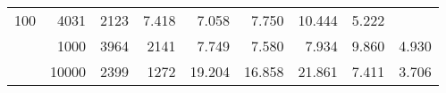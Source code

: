 \begin{table}
\begin{tabular}{rrrrrrrrr}
					\multirow{ 1 }{*}{ 100 } &
					
						
							    
							     4031  & 2123  
	                           & 7.418 & 7.058 & 7.750
	                           & 10.444 & 5.222  \\
	                
	            
					 &  
					 
					\multirow{ 1 }{*}{ 1000 } &
					
						
							    
							     3964  & 2141  
	                           & 7.749 & 7.580 & 7.934
	                           & 9.860 & 4.930  \\
	                
	            
					 &  
					 
					\multirow{ 1 }{*}{ 10000 } &
					
						
							    
							     2399  & 1272  
	                           & 19.204 & 16.858 & 21.861
	                           & 7.411 & 3.706  \\
	                
	            
	        

\hline

\end{tabular}
\end{table}
\clearpage


	    

